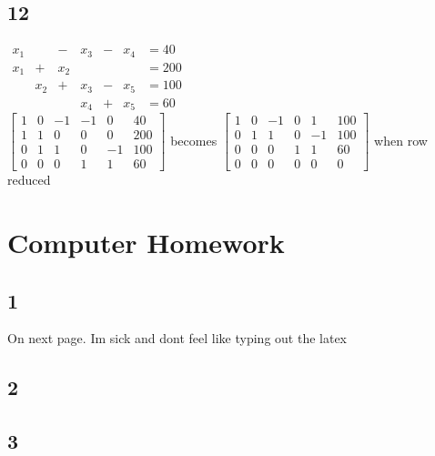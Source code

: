 \documentclass{article}
\begin{document}
\subsection*{12}
$\begin{array}{rcrcrcl}x_1 &  & - & x_3 & - & x_4 & = 40 \\x_1 & + & x_2 &  &  &  & = 200 \\& x_2 & + & x_3 & - & x_5 & = 100 \\&  &  & x_4 & + & x_5 & = 60\end{array}$
\\[0.1in] $\begin{bmatrix}
    1 & 0 & -1 & -1 & 0 & 40 \\
    1 & 1 & 0 & 0 & 0 & 200 \\
    0 & 1 & 1 & 0 & -1 & 100 \\
    0 & 0 & 0 & 1 & 1 & 60
    \end{bmatrix}
$ becomes $
    \begin{bmatrix}
    1 & 0 & -1 & 0 & 1 & 100 \\
    0 & 1 & 1 & 0 & -1 & 100 \\
    0 & 0 & 0 & 1 & 1 & 60 \\
    0 & 0 & 0 & 0 & 0 & 0
    \end{bmatrix}$ when row reduced
\section*{Computer Homework}
\subsection*{1} On next page. Im sick and dont feel like typing out the latex
\subsection*{2}
\subsection*{3}
\end{document}
